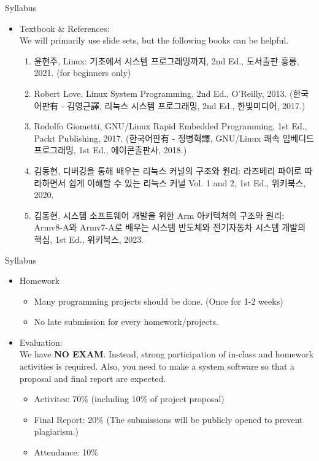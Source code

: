 \begin{frame}{Syllabus}
  \begin{itemize}
  \item Textbook \& References: \\ We will primarily use slide sets, but the following books can be helpful.
    \begin{enumerate}
      \item 윤현주, Linux: 기초에서 시스템 프로그래밍까지, 2nd Ed., 도서출판 홍릉, 2021. (for beginners only)
      \item Robert Love, Linux System Programming, 2nd Ed., O'Reilly, 2013. (한국어판有 - 김영근譯, 리눅스 시스템 프로그래밍, 2nd Ed., 한빛미디어, 2017.)
      \item Rodolfo Giometti, GNU/Linux Rapid Embedded Programming, 1st Ed., Packt Publishing, 2017. (한국어판有 - 정병혁譯, GNU/Linux 쾌속 임베디드 프로그래밍, 1st Ed., 에이콘출판사, 2018.)
      \item 김동현, 디버깅을 통해 배우는 리눅스 커널의 구조와 원리: 라즈베리 파이로 따라하면서 쉽게 이해할 수 있는 리눅스 커널 Vol. 1 and 2, 1st Ed., 위키북스, 2020.
      \item 김동현, 시스템 소프트웨어 개발을 위한 Arm 아키텍처의 구조와 원리: Armv8-A와 Armv7-A로 배우는 시스템 반도체와 전기자동차 시스템 개발의 핵심, 1st Ed., 위키북스, 2023.
    \end{enumerate}
  \end{itemize}
\end{frame}

\begin{frame}{Syllabus}
  \begin{itemize}  
  \item Homework
    \begin{itemize}
      \item Many programming projects should be done. (Once for 1-2 weeks)
      \item No late submission for every homework/projects.      
    \end{itemize}
  \item Evaluation:\\ We have \textbf{NO EXAM}. Instead, strong participation of in-class and homework activities is required. Also, you need to make a system software so that a proposal and final report are expected.
    \begin{itemize}
      \item Activites: 70\% (including 10\% of project proposal)
      \item Final Report: 20\% (The submissions will be publicly opened to prevent plagiarism.)
      \item Attendance: 10\%
    \end{itemize}    
  \end{itemize}
\end{frame}

